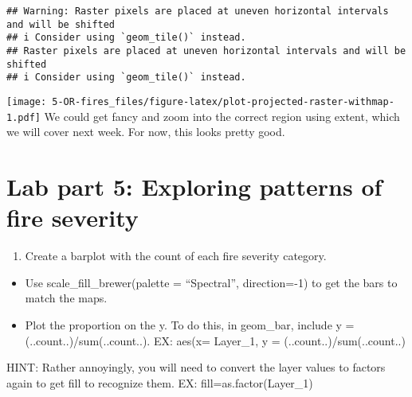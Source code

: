 \documentclass[
]{article}
\providecommand{\tightlist}{%
  \setlength{\itemsep}{0pt}\setlength{\parskip}{0pt}}
\begin{document}
\begin{verbatim}
## Warning: Raster pixels are placed at uneven horizontal intervals and will be shifted
## i Consider using `geom_tile()` instead.
## Raster pixels are placed at uneven horizontal intervals and will be shifted
## i Consider using `geom_tile()` instead.
\end{verbatim}

\texttt{[image: 5-OR-fires\_files/figure-latex/plot-projected-raster-withmap-1.pdf]}
We could get fancy and zoom into the correct region using extent, which
we will cover next week. For now, this looks pretty good.

\hypertarget{lab-part-5-exploring-patterns-of-fire-severity}{%
\section{Lab part 5: Exploring patterns of fire
severity}\label{lab-part-5-exploring-patterns-of-fire-severity}}

\begin{enumerate}
\def\labelenumi{\alph{enumi}.}
\tightlist
\item
  Create a barplot with the count of each fire severity category.
\end{enumerate}

\begin{itemize}
\tightlist
\item
  Use scale\_fill\_brewer(palette = ``Spectral'', direction=-1) to get
  the bars to match the maps.
\item
  Plot the proportion on the y. To do this, in geom\_bar, include y =
  (..count..)/sum(..count..). EX: aes(x= Layer\_1, y =
  (..count..)/sum(..count..)
\end{itemize}

HINT: Rather annoyingly, you will need to convert the layer values to
factors again to get fill to recognize them. EX:
fill=as.factor(Layer\_1)
\end{document}
